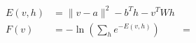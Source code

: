 
\begin{slide}
    \begin{align*}
        E(v,h) &= \|v-a\|^2 -b^Th - v^TWh\\
        F(v) &=-\ln\left(\sum_h e^{-E(v,h)}\right)
        &= 
    \end{align*}
    
\end{slide}